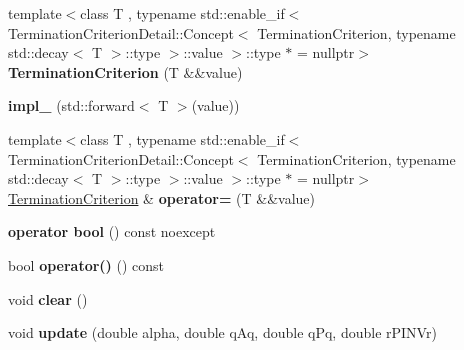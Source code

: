 \begin{DoxyCompactItemize}
\item 
\hypertarget{classSpacy_1_1CG_1_1TerminationCriterion_a802fa06abd50e597332969cbd7d39bc5}{{\footnotesize template$<$class T , typename std\-::enable\-\_\-if$<$ Termination\-Criterion\-Detail\-::\-Concept$<$ Termination\-Criterion, typename std\-::decay$<$ T $>$\-::type $>$\-::value $>$\-::type $\ast$  = nullptr$>$ }\\{\bfseries \-Termination\-Criterion} (\-T \&\&value)}\label{classSpacy_1_1CG_1_1TerminationCriterion_a802fa06abd50e597332969cbd7d39bc5}

\item 
\hypertarget{classSpacy_1_1CG_1_1TerminationCriterion_a7979d882d30902fbfcbbb9b0476fb39c}{{\bfseries impl\-\_\-} (std\-::forward$<$ \-T $>$(value))}\label{classSpacy_1_1CG_1_1TerminationCriterion_a7979d882d30902fbfcbbb9b0476fb39c}

\item 
\hypertarget{classSpacy_1_1CG_1_1TerminationCriterion_ac0f2c2ed8e6cb00861ae1131eb2eb3a2}{{\footnotesize template$<$class T , typename std\-::enable\-\_\-if$<$ Termination\-Criterion\-Detail\-::\-Concept$<$ Termination\-Criterion, typename std\-::decay$<$ T $>$\-::type $>$\-::value $>$\-::type $\ast$  = nullptr$>$ }\\\hyperlink{classSpacy_1_1CG_1_1TerminationCriterion}{\-Termination\-Criterion} \& {\bfseries operator=} (\-T \&\&value)}\label{classSpacy_1_1CG_1_1TerminationCriterion_ac0f2c2ed8e6cb00861ae1131eb2eb3a2}

\item 
\hypertarget{classSpacy_1_1CG_1_1TerminationCriterion_a527774f74e16fe94efa958e594c1be6d}{{\bfseries operator bool} () const noexcept}\label{classSpacy_1_1CG_1_1TerminationCriterion_a527774f74e16fe94efa958e594c1be6d}

\item 
\hypertarget{classSpacy_1_1CG_1_1TerminationCriterion_ab109eb287dd3622db54bbbdf0a55660a}{bool {\bfseries operator()} () const }\label{classSpacy_1_1CG_1_1TerminationCriterion_ab109eb287dd3622db54bbbdf0a55660a}

\item 
\hypertarget{classSpacy_1_1CG_1_1TerminationCriterion_a347651c14a38ce3bf1c92454aded97ab}{void {\bfseries clear} ()}\label{classSpacy_1_1CG_1_1TerminationCriterion_a347651c14a38ce3bf1c92454aded97ab}

\item 
\hypertarget{classSpacy_1_1CG_1_1TerminationCriterion_a4ef7ad43f594bab9b21f60e36697c516}{void {\bfseries update} (double alpha, double q\-Aq, double q\-Pq, double r\-P\-I\-N\-Vr)}\label{classSpacy_1_1CG_1_1TerminationCriterion_a4ef7ad43f594bab9b21f60e36697c516}


\end{DoxyCompactItemize}
